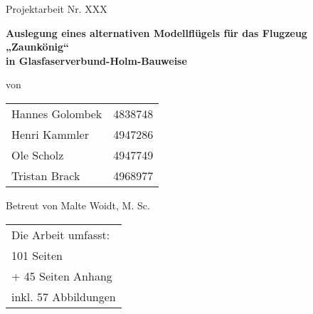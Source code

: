 
\begin{center}

	\par\bigskip
	\par\bigskip
	\par\bigskip
	\par\bigskip	
	\par\bigskip
	\par\bigskip	
	{Projektarbeit Nr. XXX}\\
\begin{huge}	\par\bigskip
	\par\bigskip	
	\par\bigskip
	\par\bigskip	
	\textbf{Auslegung eines alternativen Modellflügels für das Flugzeug „Zaunkönig“} \\
	\textbf{in Glasfaserverbund-Holm-Bauweise}\\
	\par\bigskip
	\par\bigskip
	
	\end{huge}

	\par\bigskip
	
\par\bigskip
\par\bigskip	
	\par\bigskip
\par\bigskip
von	
\par\bigskip
\par\bigskip
\begin{tabular}{lr}
	Hannes Golombek & 4838748\\
	Henri Kammler & 4947286\\
	Ole Scholz & 4947749 \\
	Tristan Brack& 4968977\\
\end{tabular}
\par\bigskip
\par\bigskip	
\par\bigskip

Betreut von Malte Woidt, M. Sc.\\
\par\bigskip
\par\bigskip
\par\bigskip	
\par\bigskip
\par\bigskip	
\par\bigskip
\end{center}
\begin{tabular}{l}
	Die Arbeit umfasst:\\
	101 Seiten\\
	\:\:\:+ 45 Seiten Anhang\\
	inkl. 57 Abbildungen\\
\end{tabular}

